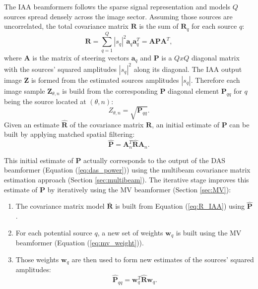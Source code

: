 \noindent
The IAA beamformers follows the sparse signal representation and models $Q$ sources spread densely across the image sector. Assuming those sources are uncorrelated, the total covariance matrix $\boldsymbol{R}$ is the sum of $\boldsymbol{R}_q$ for each source $q$:
\begin{equation}
    \boldsymbol{R} = \sum_{q=1}^{Q} |s_q|^2 \boldsymbol{a}_q \boldsymbol{a}_q^T = \boldsymbol{A} \boldsymbol{P} \boldsymbol{A}^T,
\label{eq:R_IAA}
\end{equation}
\noindent
where $\boldsymbol{A}$ is the matrix of steering vectors $\boldsymbol{a}_q$ and $\boldsymbol{P}$ is a $Q x Q$ diagonal matrix with the sources' squared amplitudes $|s_q|^2$ along its diagonal.
The IAA output image $\boldsymbol{Z}$ is formed from the estimated sources amplitudes $|s_q|$. Therefore each image sample $\boldsymbol{Z}_{\theta,n}$ is build from the corresponding $\boldsymbol{P}$ diagonal element $\boldsymbol{P}_{qq}$ for $q$ being the source located at $(\theta,n)$:
\begin{equation}
    Z_{\theta,n} = \sqrt{\boldsymbol{P}_{qq}}.
\label{eq:IAA_output}
\end{equation}
\noindent
Given an estimate $\boldsymbol{\hat{R}}$ of the covariance matrix $\boldsymbol{R}$, an initial estimate of $\boldsymbol{P}$ can be built by applying matched spatial filtering:
\begin{equation}
    \boldsymbol{\hat{P}} = \boldsymbol{A}_n^T \boldsymbol{\hat{R}} \boldsymbol{A}_n.
\end{equation}

\noindent
This initial estimate of $\boldsymbol{P}$ actually corresponds to the output of the DAS beamformer (Equation (\ref{eq:das_power})) using the multibeam covariance matrix estimation approach (Section \ref{sec:multibeam}).
The iterative stage improves this estimate of $\boldsymbol{P}$ by iteratively using the MV beamformer (Section \ref{sec:MV}):
\begin{enumerate}
    \item The covariance matrix model $\boldsymbol{\bar{R}}$ is built from Equation (\ref{eq:R_IAA}) using $\boldsymbol{\hat{P}}$.
    \item For each potential source $q$, a new set of weights $\boldsymbol{w}_q$ is built using the MV beamformer (Equation (\ref{eq:mv_weight})).
    \item Those weights $\boldsymbol{w}_q$ are then used to form new estimates of the sources' squared amplitudes:
    \begin{equation}
        \boldsymbol{\hat{P}}_{qq} = \boldsymbol{w}_q^T \boldsymbol{\hat{R}} \boldsymbol{w}_q.
    \label{eq:mb_output}
    \end{equation}
\end{enumerate}

